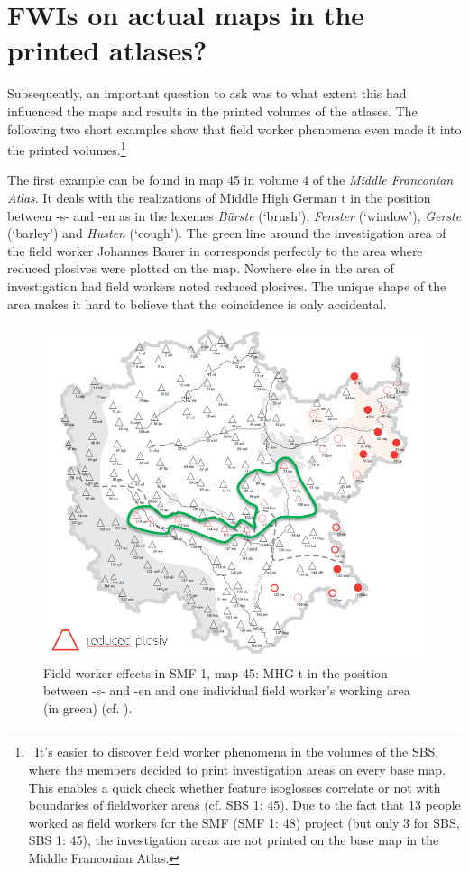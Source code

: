 \documentclass[output=paper]{LSP/langsci}
\begin{document}
\section{FWIs on actual maps in the printed atlases?}
Subsequently, an important question to ask was to what extent this had influenced the maps and results in the printed volumes of the atlases. The following two short examples show that field worker phenomena even made it into the printed volumes.\footnote{\ It's easier to discover field worker phenomena in the volumes of the SBS, where the members decided to print investigation areas on every base map. This enables a quick check whether feature isoglosses correlate or not with boundaries of fieldworker areas (cf. SBS 1: 45). Due to the fact that 13 people worked as field workers for the SMF (SMF 1: 48) project (but only 3 for SBS, SBS 1: 45), the investigation areas are not printed on the base map in the Middle Franconian Atlas.}

The first example can be found in map 45 in volume 4 of the \textit{Middle Franconian Atlas}. It deals with the realizations of Middle High German t in the position between -s- and -en as in the lexemes \textit{Bürste} (`brush'), \textit{Fenster} (`window'), \textit{Gerste} (`barley') and \textit{Husten} (`cough'). The green line around the investigation area of the field worker Johannes Bauer in  corresponds perfectly to the area where reduced plosives were plotted on the map. Nowhere else in the area of investigation had field workers noted reduced plosives. The unique shape of the area makes it hard to believe that the coincidence is only accidental.

\begin{figure}[t]
\includegraphics[width=.7\textwidth]{illustrations/mathus_fig11}
\caption{Field worker effects in SMF 1, map 45: MHG t in the position between -s- and -en and one individual field worker's working area (in green) (cf. \citealt[240]{mathussek_sprachraume_2014}).}
\label{fig:mathus:11}
\end{figure}
\end{document}

